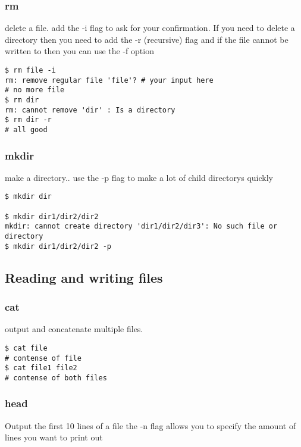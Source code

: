 \documentclass[a4paper]{article}
\begin{document}
\subsubsection*{rm}
\label{sec:org6ff3a26}
\begin{notes}
	delete a file. add the -i flag to ask for your confirmation. If you need to
	delete a directory then you need to add the -r (recursive) flag and if the file
	cannot be written to then you can use the -f option
\end{notes}

\begin{verbatim}
$ rm file -i
rm: remove regular file 'file'? # your input here
# no more file
$ rm dir
rm: cannot remove 'dir' : Is a directory
$ rm dir -r
# all good
\end{verbatim}

\subsubsection*{mkdir}
\label{sec:org9cd4f19}
\begin{notes}
	make a directory.. use the -p flag to make a lot of child directorys quickly
\end{notes}

\begin{verbatim}
$ mkdir dir

$ mkdir dir1/dir2/dir2
mkdir: cannot create directory 'dir1/dir2/dir3': No such file or directory
$ mkdir dir1/dir2/dir2 -p
\end{verbatim}
\subsection*{Reading and writing files}
\label{sec:org7628cc0}
\subsubsection*{cat}
\label{sec:org41b191a}
\begin{notes}
	output and concatenate multiple files.
\end{notes}

\begin{verbatim}
$ cat file
# contense of file
$ cat file1 file2
# contense of both files
\end{verbatim}
\subsubsection*{head}
\label{sec:org2138524}
\begin{notes}
	Output the first 10 lines of a file
	the -n flag allows you to specify the amount of lines you want to print out
\end{notes}
\end{document}
